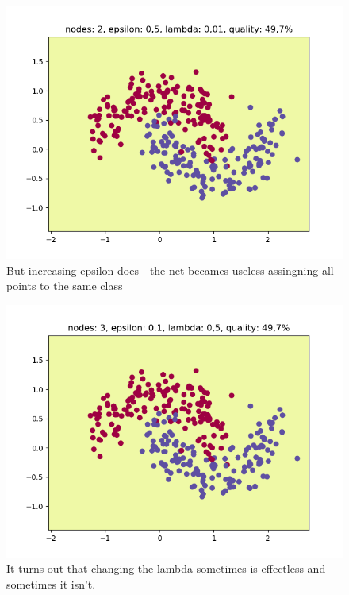 \documentclass[3p,twocolumn]{elsarticle}
\begin{document}
\begin{figure}[h]
\label{fig:fig4}
  \includegraphics[width=\linewidth]{wykresy/5.png}
	\caption{But increasing epsilon does - the net becames useless assingning all points to the same class}
	\label{fig4}
\end{figure}

\begin{figure}[h]
\label{fig:fig4}
  \includegraphics[width=\linewidth]{wykresy/10.png}
	\caption{It turns out that changing the lambda sometimes is effectless and sometimes it isn't.}
	\label{fig4}
\end{figure}
\end{document}
